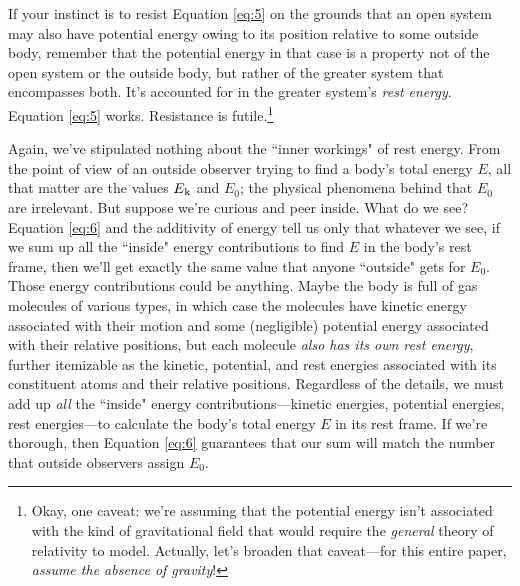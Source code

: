 \documentclass[12pt]{article}
\begin{document}
If your instinct is to resist Equation \ref{eq:5} on the grounds that an open system may also have potential energy owing to its position relative to some outside body, remember that the potential energy in that case is a property not of the open system or the outside body, but rather of the greater system that encompasses both. It's accounted for in the greater system's \emph{rest energy}. Equation \ref{eq:5} works. Resistance is futile.\footnote{Okay, one caveat: we're assuming that the potential energy isn't associated with the kind of gravitational field that would require the \emph{general} theory of relativity to model. Actually, let's broaden that caveat---for this entire paper, \emph{assume the absence of gravity}!}

Again, we've stipulated nothing about the ``inner workings" of rest energy. From the point of view of an outside observer trying to find a body's total energy $E$, all that matter are the values $E_{\mkern.5mu \textrm{k}}$ and $E_0$; the physical phenomena behind that $E_0$ are irrelevant. But suppose we're curious and peer inside. What do we see? Equation \ref{eq:6} and the additivity of energy tell us only that whatever we see, if we sum up all the ``inside" energy contributions to find $E$ in the body's rest frame, then we'll get exactly the same value that anyone ``outside" gets for $E_0$. Those energy contributions could be anything. Maybe the body is full of gas molecules of various types, in which case the molecules have kinetic energy associated with their motion and some (negligible) potential energy associated with their relative positions, but each molecule \emph{also has its own rest energy}, further itemizable as the kinetic, potential, and rest energies associated with its constituent atoms and their relative positions. Regardless of the details, we must add up \emph{all} the ``inside" energy contributions---kinetic energies, potential energies, rest energies---to calculate the body's total energy $E$ in its rest frame. If we're thorough, then Equation \ref{eq:6} guarantees that our sum will match the number that outside observers assign $E_0$.
\end{document}
